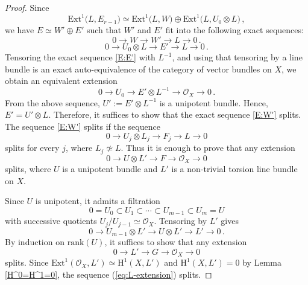 \documentclass[10pt,a4paper]{amsart}
\begin{document}
\begin{proof}
	
	Since 
	$$\mathrm{Ext}^1 \bigl( L, E_{r-1} \bigr) \simeq \mathrm{Ext}^1 \bigl( L, W \bigr) \oplus \mathrm{Ext}^1 \bigl( L, U_0 \otimes L \bigr)\,,$$
	we have $E \simeq W' \oplus E'$ such that $W'$ and $E'$ fit into the following exact sequences: 
	\begin{equation}\label{E:W'}
		0\longrightarrow W \longrightarrow W' \longrightarrow L \longrightarrow 0 \,.
	\end{equation}
	\begin{equation}\label{E:E'}
		0\longrightarrow U_0 \otimes L \longrightarrow E' \longrightarrow L \longrightarrow 0 \,.
	\end{equation}
	Tensoring the exact sequence \eqref{E:E'} with \(L^{-1}\), and using that tensoring by a line bundle is an exact auto-equivalence of the category of vector bundles on \(X\), we obtain an equivalent extension
	\begin{equation}\label{eq:quence}
		0 \longrightarrow U_0 \longrightarrow E'\otimes L^{-1} \longrightarrow \mathcal{O}_X \longrightarrow 0 \,.
	\end{equation}
	From the above sequence, $U':=E'\otimes L^{-1}$ is a unipotent bundle. Hence, $E'=U' \otimes L$. Therefore, it suffices to show that the exact sequence \eqref{E:W'} splits. The sequence \eqref{E:W'} splits if the sequence 
	$$0 \longrightarrow U_j \otimes L_j \longrightarrow F_j \longrightarrow L \longrightarrow 0 $$
	splits for every $j$, where $L_j \not \simeq L$. Thus it is enough to prove that any extension
	\begin{equation}\label{eq:Ui-extension}
		0 \longrightarrow U \otimes L' \longrightarrow F \longrightarrow \mathcal{O}_X \longrightarrow 0
	\end{equation}
	splits, where \(U\) is a unipotent bundle and \(L'\) is a non-trivial torsion line bundle on \(X\).
	
	Since \(U\) is unipotent, it admits a filtration
	\[
	0 = U_0 \subset U_1 \subset \cdots \subset U_{m-1} \subset U_m = U
	\]
	with successive quotients \(U_j/U_{j-1} \simeq \mathcal{O}_X\). Tensoring by \(L'\) gives
	\[
	0 \longrightarrow U_{m-1}\otimes L' \longrightarrow U \otimes L' \longrightarrow L' \longrightarrow 0 \,.
	\]
	By induction on \(\mathrm{rank}(U)\), it suffices to show that any extension
	\begin{equation}\label{eq:L-extension}
		0 \longrightarrow L' \longrightarrow G \longrightarrow \mathcal{O}_X \longrightarrow 0
	\end{equation}
	splits. Since $\mathrm{Ext}^1(\mathcal{O}_X, L') \simeq \mathrm{H}^1(X, L')$ and $\mathrm{H}^1(X, L')=0$ by Lemma \ref{H^0=H^1=0}, the sequence (\ref{eq:L-extension}) splits.
\end{proof}
\end{document}
